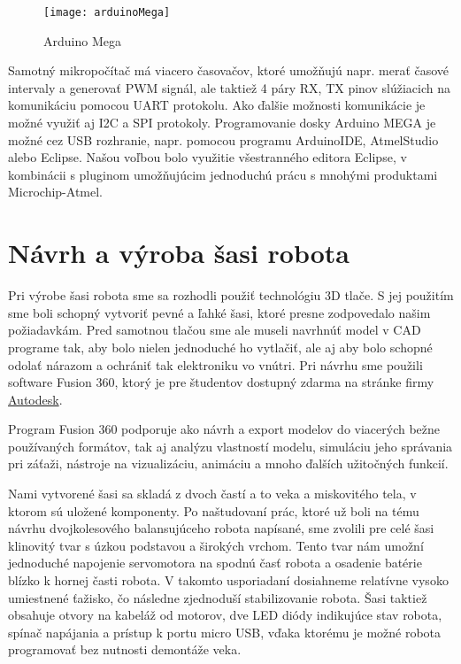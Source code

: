\begin{figure}[h]
\centering
\texttt{[image: arduinoMega]}
\caption{Arduino Mega\cite{arduinoMEGA}}
\label{fig:arduinoMega}
\end{figure}

Samotný mikropočítač má viacero časovačov, ktoré umožňujú napr. merať časové intervaly a generovať PWM signál, ale taktiež 4 páry RX, TX pinov slúžiacich na komunikáciu pomocou UART protokolu. Ako ďalšie možnosti komunikácie je možné využiť aj I2C a SPI protokoly. Programovanie dosky Arduino MEGA je možné cez USB rozhranie, napr. pomocou programu ArduinoIDE, AtmelStudio alebo Eclipse. Našou voľbou bolo využitie všestranného editora Eclipse, v kombinácii s pluginom umožňujúcim jednoduchú prácu s mnohými produktami Microchip-Atmel.



\section{Návrh a výroba šasi robota}
Pri výrobe šasi robota sme sa rozhodli použiť technológiu 3D tlače. S jej použitím sme boli schopný vytvoriť pevné a ľahké šasi, ktoré presne zodpovedalo našim požiadavkám. Pred samotnou tlačou sme ale museli navrhnúť model v CAD programe tak, aby bolo nielen jednoduché ho vytlačiť, ale aj aby bolo schopné odolať nárazom a ochrániť tak elektroniku vo vnútri. Pri návrhu sme použili software Fusion 360, ktorý je pre študentov dostupný zdarma na stránke firmy \href{https://www.autodesk.com/products/fusion-360/overview}{Autodesk}.

Program Fusion 360 podporuje ako návrh a export modelov do viacerých bežne používaných formátov, tak aj analýzu vlastností modelu, simuláciu jeho správania pri záťaži, nástroje na vizualizáciu, animáciu a mnoho ďalších užitočných funkcií.

Nami vytvorené šasi  sa skladá z dvoch častí a to veka a miskovitého tela, v ktorom sú uložené komponenty. Po naštudovaní prác, ktoré už boli na tému návrhu dvojkolesového balansujúceho robota napísané, sme zvolili pre celé šasi klinovitý tvar s úzkou podstavou a širokých vrchom. Tento tvar nám umožní jednoduché napojenie servomotora na spodnú časť robota a osadenie batérie blízko k hornej časti robota. V takomto usporiadaní dosiahneme relatívne vysoko umiestnené ťažisko, čo následne zjednoduší stabilizovanie robota. Šasi taktiež obsahuje otvory na kabeláž od motorov, dve LED diódy indikujúce stav robota, spínač napájania a prístup k portu micro USB, vďaka ktorému je možné robota programovať bez nutnosti demontáže veka.


